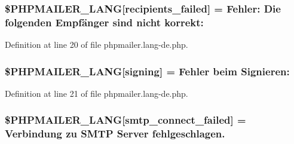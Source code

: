 \subsubsection[{\texorpdfstring{\$\+P\+H\+P\+M\+A\+I\+L\+E\+R\+\_\+\+L\+A\+NG}{$PHPMAILER_LANG}}]{\setlength{\rightskip}{0pt plus 5cm}\$P\+H\+P\+M\+A\+I\+L\+E\+R\+\_\+\+L\+A\+NG\mbox{[}\textquotesingle{}recipients\+\_\+failed\textquotesingle{}\mbox{]} =  Fehler\+: Die folgenden Empfänger sind nicht korrekt\+: \textquotesingle{}}\hypertarget{phpmailer_8lang-de_8php_a7589d30bb9b368327c2df015f3e6bcba}{}\label{phpmailer_8lang-de_8php_a7589d30bb9b368327c2df015f3e6bcba}


Definition at line 20 of file phpmailer.\+lang-\/de.\+php.

\subsubsection[{\texorpdfstring{\$\+P\+H\+P\+M\+A\+I\+L\+E\+R\+\_\+\+L\+A\+NG}{$PHPMAILER_LANG}}]{\setlength{\rightskip}{0pt plus 5cm}\$P\+H\+P\+M\+A\+I\+L\+E\+R\+\_\+\+L\+A\+NG\mbox{[}\textquotesingle{}signing\textquotesingle{}\mbox{]} = \textquotesingle{}Fehler beim Signieren\+: \textquotesingle{}}\hypertarget{phpmailer_8lang-de_8php_a68e437bdb9b968a5a67320f03d231565}{}\label{phpmailer_8lang-de_8php_a68e437bdb9b968a5a67320f03d231565}


Definition at line 21 of file phpmailer.\+lang-\/de.\+php.

\subsubsection[{\texorpdfstring{\$\+P\+H\+P\+M\+A\+I\+L\+E\+R\+\_\+\+L\+A\+NG}{$PHPMAILER_LANG}}]{\setlength{\rightskip}{0pt plus 5cm}\$P\+H\+P\+M\+A\+I\+L\+E\+R\+\_\+\+L\+A\+NG\mbox{[}\textquotesingle{}smtp\+\_\+connect\+\_\+failed\textquotesingle{}\mbox{]} = \textquotesingle{}Verbindung zu {\bf S\+M\+TP} Server fehlgeschlagen.\textquotesingle{}}\hypertarget{phpmailer_8lang-de_8php_a7b321d4ca1e9df702403ed4c61aa0980}{}\label{phpmailer_8lang-de_8php_a7b321d4ca1e9df702403ed4c61aa0980}


